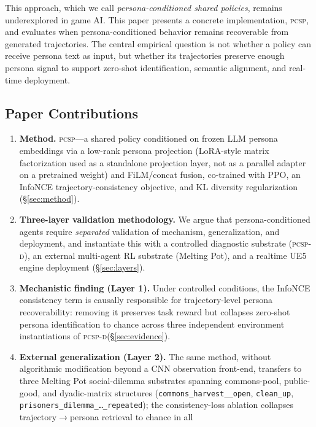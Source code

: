 \documentclass[conference]{IEEEtran}
\newcommand{\PCSP}{\textsc{pcsp}\xspace}
\newcommand{\PCSPD}{\textsc{pcsp-d}\xspace}
\begin{document}
This approach, which we call \emph{persona-conditioned shared
policies}, remains underexplored in game AI. This paper presents a concrete
implementation, \PCSP, and evaluates when persona-conditioned behavior remains
recoverable from generated trajectories. The central empirical question is not
whether a policy can receive persona text as input, but whether its trajectories
preserve enough persona signal to support zero-shot identification, semantic
alignment, and real-time deployment.

\subsection{Paper Contributions}

\begin{enumerate}
  \setlength\itemsep{2pt}
  \item \textbf{Method.} \PCSP{}---a shared policy conditioned on frozen LLM
    persona embeddings via a low-rank persona projection (LoRA-style matrix
    factorization used as a standalone projection layer, not as a parallel
    adapter on a pretrained weight) and FiLM/concat fusion,
    co-trained with PPO, an InfoNCE trajectory-consistency objective, and
    KL diversity regularization (\S\ref{sec:method}).
  \item \textbf{Three-layer validation methodology.} We argue that
    persona-conditioned agents require \emph{separated} validation of
    mechanism, generalization, and deployment, and instantiate this with a
    controlled diagnostic substrate (\PCSPD), an external multi-agent RL
    substrate (Melting Pot), and a realtime UE5 engine deployment
    (\S\ref{sec:layers}).
  \item \textbf{Mechanistic finding (Layer 1).} Under controlled conditions,
    the InfoNCE consistency term is causally responsible for trajectory-level
    persona recoverability: removing it preserves task reward but collapses
    zero-shot persona identification to chance across three independent
    environment instantiations of \PCSPD (\S\ref{sec:evidence}).
  \item \textbf{External generalization (Layer 2).} The same method, without
    algorithmic modification beyond a CNN observation front-end, transfers to
    three Melting Pot social-dilemma substrates spanning commons-pool,
    public-good, and dyadic-matrix structures
    (\texttt{commons\_harvest\_\_open}, \texttt{clean\_up},
    \texttt{prisoners\_dilemma\_\dots\_repeated}); the consistency-loss
    ablation collapses trajectory$\to$persona retrieval to chance in all

\end{enumerate}
\end{document}

